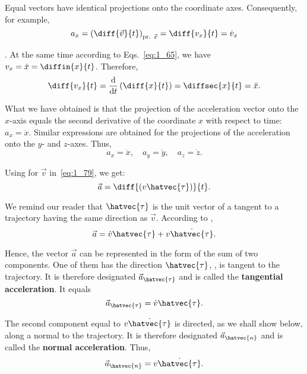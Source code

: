 Equal vectors have identical projections onto the coordinate axes. Consequently, for example,
\begin{equation*}
a_x = \left(\diff{\vec{v}}{t}\right)_{\text{pr. }\vec{x}} = \diff{v_x}{t} = \dot{v}_x
\end{equation*}

. At the same time according to Eqs.~\eqref{eq:1_65}, we have $v_x=\dot{x}=\diffin{x}{t}$. Therefore,
\begin{equation*}
\diff{v_x}{t} = \frac{\mathrm{d}}{\mathrm{d}t} \left(\diff{x}{t}\right) = \diffsec{x}{t} = \ddot{x}.
\end{equation*}

\noindent
What we have obtained is that the projection of the acceleration vector onto the $x$-axis equals the second derivative of the coordinate $x$ with respect to time: $a_x=\ddot{x}$. Similar expressions are obtained for the projections of the acceleration onto the $y$- and $z$-axes. Thus,
\begin{equation}\label{eq:1_80}
a_x=\ddot{x},\quad a_y=\ddot{y},\quad a_z=\ddot{z}.
\end{equation}

Using  for $\vec{v}$ in~\eqref{eq:1_79}, we get:
\begin{equation}\label{eq:1_81}
\vec{a} = \diff{(v\hatvec{\tau})}{t}.
\end{equation}

\noindent
We remind our reader that $\hatvec{\tau}$ is the unit vector of a tangent to a trajectory having the same direction as $\vec{v}$. According to ,
\begin{equation}\label{eq:1_82}
\vec{a} = \dot{v}\hatvec{\tau} + v\dot{\hatvec{\tau}}.
\end{equation}

\noindent
Hence, the vector $\vec{a}$ can be represented in the form of the sum of two components. One of them has the direction $\hatvec{\tau}$, \ie, is tangent to the trajectory. It is therefore designated $\vec{a}_{\hatvec{\tau}}$ and is called the \textbf{tangential acceleration}. It equals
\begin{equation}\label{eq:1_83}
\vec{a}_{\hatvec{\tau}} = \dot{v}\hatvec{\tau}.
\end{equation}

\noindent
The second component equal to $v\dot{\hatvec{\tau}}$ is directed, as we shall show below, along a normal to the trajectory. It is therefore designated $\vec{a}_{\hatvec{n}}$ and is called the \textbf{normal acceleration}. Thus,
\begin{equation}\label{eq:1_84}
\vec{a}_{\hatvec{n}} = v\dot{\hatvec{\tau}}.
\end{equation}

